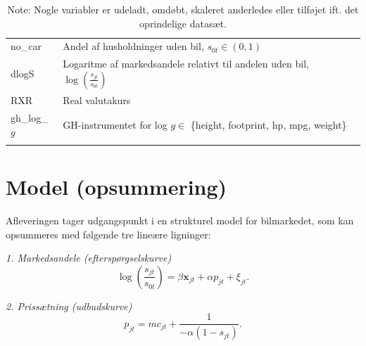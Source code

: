 \documentclass[a4paper,12pt]{article}
\begin{document}
\begin{table}[H]
\begin{tabular}{p{3cm}p{11cm}}
    {no\_car} & Andel af husholdninger uden bil, $s_{0t} \in (0,1)$ \\
    {dlogS} & Logaritme af markedsandele relativt til andelen uden bil,  
    $\log \left(\frac {s_{jt}} {s_{0t}} \right)$ \\
    {RXR} & Real valutakurs \\
    {gh\_log\_$g$} & GH-instrumentet for log $g \in$ \{height, footprint, hp, mpg, weight\} \\
    \bottomrule
    \\
    \end{tabular}
    \label{tab:variable_description}
    \caption*{Note: Nogle variabler er udeladt, omdøbt, skaleret anderledes eller tilføjet ift. det oprindelige datasæt. }
\end{table}

\newpage

\section*{Model (opsummering)}
Afleveringen tager udgangspunkt i en strukturel model for bilmarkedet, som kan opsummeres med følgende tre lineære ligninger:

\vspace{1em}
\noindent \emph{1. Markedsandele (efterspørgselskurve)}
\begin{equation}
    \log\left(\frac{s_{jt}}{s_{0t}}\right) = \beta \mathbf{x}_{jt} + \alpha p_{jt} + \xi_{jt}. \label{eq:demand}    
\end{equation}


\noindent \emph{2. Prissætning (udbudskurve)}
\begin{equation}
    p_{jt}  = mc_{jt} +\frac{1}{-\alpha (1 - s_{jt})}. \label{eq:supply}    
\end{equation}
\end{document}
